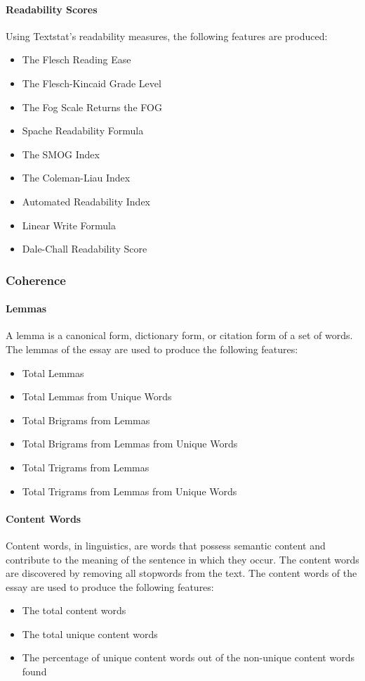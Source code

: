 \paragraph{Readability Scores}
Using Textstat's readability measures, the following features are produced:
\begin{itemize}
 \item The Flesch Reading Ease
 \item The Flesch-Kincaid Grade Level
 \item The Fog Scale Returns the FOG
 \item Spache Readability Formula
 \item The SMOG Index
 \item The Coleman-Liau Index
 \item Automated Readability Index 
 \item Linear Write Formula
 \item Dale-Chall Readability Score
\end{itemize}

\subsubsection{Coherence}
\paragraph{Lemmas}
A lemma is a canonical form, dictionary form, or citation form of a set of words. The lemmas of the essay are used to produce the following features:
\begin{itemize}
 \item Total Lemmas 
 \item Total Lemmas from Unique Words 
 \item Total Brigrams from Lemmas
 \item Total Brigrams from Lemmas from Unique Words 
 \item Total Trigrams from Lemmas
 \item Total Trigrams from Lemmas from Unique Words 
\end{itemize}

\paragraph{Content Words}
Content words, in linguistics, are words that possess semantic content and contribute to the meaning of the sentence in which they occur. The content words are discovered by removing all stopwords from the text. The content words of the essay are used to produce the following features:
\begin{itemize}
 \item The total content words
 \item The total unique content words
 \item The percentage of unique content words out of the non-unique content words found 
\end{itemize}

